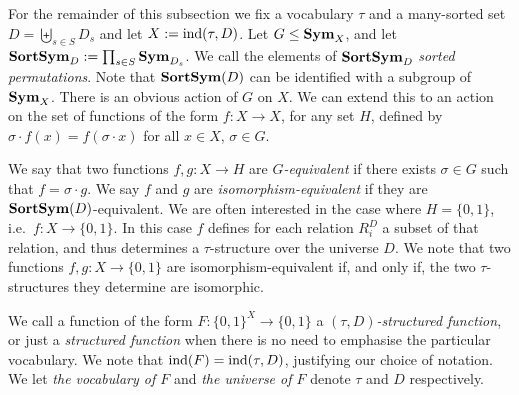 \documentclass[../paper.tex]{subfiles}
\begin{document}
For the remainder of this subsection we fix a vocabulary $\tau$ and a
many-sorted set $D=\biguplus_{s \in S} D_{s}$ and let $X := \text{\upshape ind} (\tau, D)$. Let
$G \leq \text{\textbf{Sym}}_{X}$, and let $\text{\textbf{SortSym}}_D := \prod_{s \in S} \text{\textbf{Sym}}_{D_{s}}$. We
call the elements of $\text{\textbf{SortSym}}_D$ \emph{sorted permutations}. Note that
$\text{\textbf{SortSym}}(D)$ can be identified with a subgroup of $\text{\textbf{Sym}}_X$. There is an obvious
action of $G$ on $X$. We can extend this to an action on the set of functions of
the form $f: X \rightarrow X$, for any set $H$, defined by $\sigma \cdot f(x) =
f(\sigma \cdot x)$ for all $x \in X$, $\sigma \in G$.

We say that two functions $f, g : X \rightarrow H$ are \emph{$G$-equivalent} if
there exists $\sigma \in G$ such that $f = \sigma \cdot g$. We say $f$ and $g$
are \emph{isomorphism-equivalent} if they are $\text{\textbf{SortSym}}(D)$-equivalent. We are
often interested in the case where $H = \{0,1\}$, i.e.\ $f : X \rightarrow
\{0,1\}$. In this case $f$ defines for each relation $R^D_i$ a subset of that
relation, and thus determines a $\tau$-structure over the universe $D$. We note
that two functions $f, g: X \rightarrow \{0,1\}$ are isomorphism-equivalent if,
and only if, the two $\tau$-structures they determine are isomorphic.

We call a function of the form $F:\{0,1\}^{X} \rightarrow \{0,1\}$ a
\emph{$(\tau, D)$-structured function}, or just a \emph{structured function}
when there is no need to emphasise the particular vocabulary. We note that
$\text{\upshape ind}(F) = \text{\upshape ind}(\tau, D)$, justifying our choice of notation. We let \emph{the
  vocabulary of $F$} and \emph{the universe of $F$} denote $\tau$ and $D$
respectively.


\end{document}
